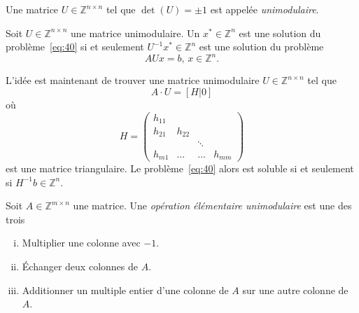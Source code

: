   \begin{definition}
    \label{def:46}
    Une matrice $U ∈ℤ^{n ×n}$ tel que $\det(U) = \pm 1$ est appelée  \emph{unimodulaire}.
  \end{definition}

  \begin{remark}
    Soit $U ∈ℤ^{n ×n}$  une matrice unimodulaire. 
    Un $x^* ∈ ℤ^n$ est une solution du problème~\eqref{eq:40} si et seulement $U^{-1} x^*∈ ℤ^n$ est une solution du problème
    \begin{equation}
      \label{eq:42}
      A U x = b, \, x ∈ℤ^n. 
    \end{equation}
  \end{remark}
L'idée est maintenant de trouver une matrice unimodulaire $U ∈ℤ^{n ×n}$ tel que
\begin{equation}
  \label{eq:44}
  A ⋅ U = [H | 0]
\end{equation}
où
\begin{displaymath}
  H =
  \begin{pmatrix}
    h_{11} \\
    h_{21} & h_{22}\\
    &  & \ddots \\
    h_{m1} & \hdots & \hdots & h_{mm}
  \end{pmatrix}
\end{displaymath}
est une matrice triangulaire. Le problème~\eqref{eq:40} alors est soluble si et seulement si
$H^{-1} b ∈ℤ^n$.

\begin{definition}
  \label{def:47}
  Soit $A ∈ ℤ^{m ×n}$ une matrice. Une \emph{opération élémentaire unimodulaire} est une des trois
  \begin{enumerate}[i)]
    \item Multiplier une colonne avec $-1$.  \label{item:21}
    \item Échanger deux colonnes de $A$.  \label{item:22}
    \item Additionner un multiple entier d'une colonne de $A$ sur une autre colonne de $A$. \label{item:23}
  \end{enumerate}
\end{definition}



